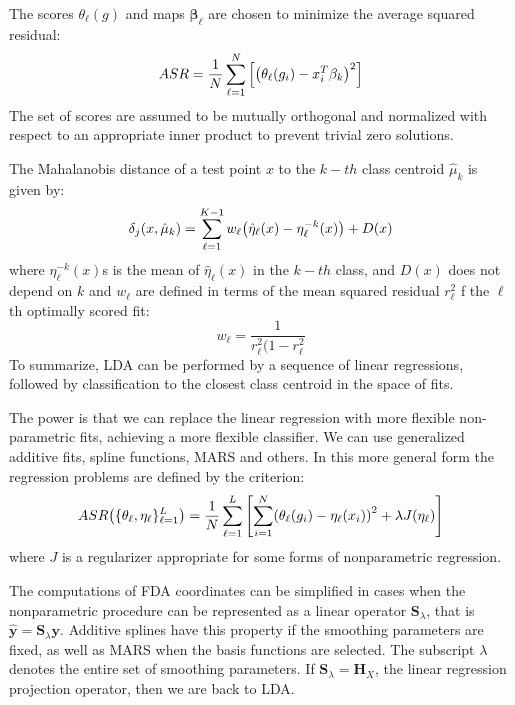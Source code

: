 \documentclass[12pt, letterpaper]{article}
\theoremstyle{definition}
\newcommand{\y}{\mathbf{y}}
\newcommand{\be}{\mathbf{\beta}}
\DeclarePairedDelimiter\autobracket{(}{)}
\newcommand{\br}[1]{\autobracket*{#1}}
\begin{document}
The scores $\theta_\ell(g)$ and maps $\be_\ell$ are chosen to minimize the average squared residual:
\begin{equation}
ASR = \frac{1}{N}\sum_{\ell=1}^N\left[ \br{\theta_\ell(g_i) - x_i^T\be_k}^2\right]
\end{equation}
The set of scores are assumed to be mutually orthogonal and normalized with respect to an appropriate inner product to prevent trivial zero solutions.

The Mahalanobis distance of a test point $x$ to the $k-th$ class centroid $\hat{\mu}_k$ is given by:
\begin{equation}
\delta_j (x, \hat{\mu}_k) = \sum_{\ell=1}^{K-1} w_\ell \br{\hat{\eta}_\ell(x) - \eta_\ell^{-k}(x) }+D(x)
\end{equation}
where $\eta_\ell^{-k}(x) $s is the mean of $\hat{\eta}_\ell(x)$ in the $k-th$ class, and $D(x)$ does not depend on $k$ and $w_\ell$ are defined in terms of the mean squared residual $r_\ell^2$ f the $\ell$th optimally scored fit:
\begin{equation}
w_\ell = \frac{1}{r_\ell^2(1-r_\ell^2}
\end{equation}
To summarize, LDA can be performed by a sequence of linear regressions, followed by classification to the closest class centroid in the space of fits.

The power is that we can replace the linear regression with more flexible non-parametric fits, achieving a more flexible classifier. We can use generalized additive fits, spline functions, MARS and others. In this more general form the regression problems are defined by the criterion:
\begin{equation}
ASR \br{\{\theta_\ell, \eta_\ell \}_{\ell=1}^L} = \frac{1}{N}\sum_{\ell=1}^L\left[\sum_{i=1}^N \br{\theta_\ell(g_i) - \eta_\ell(x_i)}^2 + \lambda J(\eta_\ell)\right]
\end{equation}
where $J$ is a regularizer appropriate for some forms of nonparametric regression.

The computations of FDA coordinates can be simplified in cases when the nonparametric procedure can be represented as a linear operator $\mathbf{S}_\lambda$, that is $\hat{\y} =\mathbf{S}_\lambda \y$. Additive splines have this property if the smoothing parameters are fixed, as well as MARS when the basis functions are selected. The subscript $\lambda$ denotes the entire set of smoothing parameters. If $\mathbf{S}_\lambda = \mathbf{H}_X$, the linear regression projection operator, then we are back to LDA.
\end{document}
